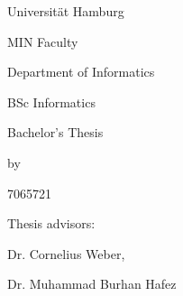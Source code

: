 \begin{titlepage}
    \centering
    Universität Hamburg \par
    MIN Faculty \par
    Department of Informatics \par
    BSc Informatics \par
    \vspace{6\baselineskip}
    {\Large Bachelor's Thesis\par}
    {\Huge \thetitle \par}
    \vspace{6\baselineskip}
    by\par
    {\Large \theauthor \par 7065721 \par}
    \vfill
    Thesis advisors:\par
    {\large Dr. Cornelius Weber, \par Dr. Muhammad Burhan Hafez}
\end{titlepage}
